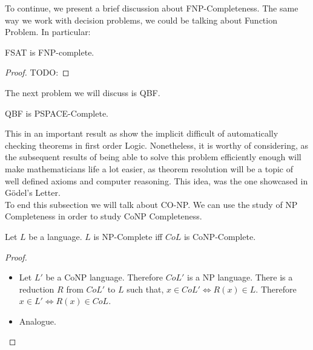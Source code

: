 
To continue,  we  present a brief discussion about FNP-Completeness. The same way we work with decision problems, we could be talking about Function Problem. In particular:

\begin{theorem} FSAT is FNP-complete.  
\end{theorem}
\begin{proof}
  TODO:
\end{proof}

The next problem we will discuss is QBF.

\begin{theorem} QBF is PSPACE-Complete.
\end{theorem}

This in an important result as show the implicit difficult of automatically checking theorems in first order Logic. Nonetheless, it is worthy of considering, as the subsequent results of being able to solve this problem efficiently enough will make mathematicians life a lot easier, as theorem resolution will be a topic of well defined axioms and computer reasoning. This idea, was the one showcased in Gödel's Letter. \\

To end this subsection we will talk about CO-NP. We can use the study of NP Completeness in order to study CoNP Completeness.

\begin{proposition}
  Let $L$ be a language. $L$ is NP-Complete iff $CoL$ is CoNP-Complete.
\end{proposition}

\begin{proof}  \hfill
  \begin{itemize}
  \item[\fbox{$\Rightarrow$}] 
    Let $L'$ be a CoNP language. Therefore $CoL'$ is a NP language. There is a reduction $R$ from $CoL'$ to $L$ such that, $x \in CoL' \iff R(x) \in L$. Therefore $x \in L' \iff R(x) \in CoL$.
  \item[\fbox{$\Leftarrow$}] Analogue.
  \end{itemize}
\end{proof}


